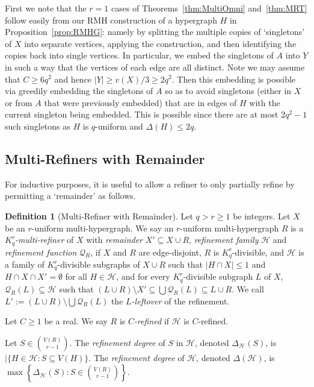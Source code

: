 \documentclass[11pt]{article}
\newcounter{i}
\theoremstyle{plain}
\theoremstyle{plain} %
\theoremstyle{definition}
\newtheorem{definition}[thm]{Definition}
\begin{document}
First we note that the $r=1$ cases of Theorems~\ref{thm:MultiOmni} and~\ref{thm:MRT} follow easily from our RMH construction of a hypergraph $H$ in Proposition~\ref{prop:RMHG}: namely by splitting the multiple copies of `singletons' of $X$ into separate vertices, applying the construction, and then identifying the copies back into single vertices. In particular, we embed the singletons of $A$ into $Y$ in such a way that the vertices of each edge are all distinct. Note we may assume that $C\ge 6q^2$ and hence $|Y|\ge v(X)/3 \ge 2q^2$. Then this embedding is possible via greedily embedding the singletons of $A$ so as to avoid  singletons (either in $X$ or from $A$ that were previously embedded) that are in edges of $H$ with the current singleton being embedded. This is possible since there are at most $2q^2-1$ such singletons as $H$ is $q$-uniform and $\Delta(H)\le 2q$.


\subsection{Multi-Refiners with Remainder}

For inductive purposes, it is useful to allow a refiner to only partially refine by permitting a `remainder' as follows.

\begin{definition}[Multi-Refiner with Remainder]\label{def:Remainder}
Let $q > r\ge 1$ be integers. Let $X$ be an $r$-uniform multi-hypergraph. We say an $r$-uniform multi-hypergraph $R$ is a \emph{$K_q^r$-multi-refiner} of $X$ with \emph{remainder} $X' \subseteq X\cup R$, \emph{refinement family} $\mathcal{H}$ and \emph{refinement function} $\mathcal{Q}_R$, if $X$ and $R$ are edge-disjoint, $R$ is $K_q^r$-divisible, and $\mathcal{H}$ is a family of $K_q^r$-divisible subgraphs of $X\cup R$ such that $|H\cap X|\le 1$ and $H\cap X\cap X'=\emptyset$ for all $H\in\mathcal{H}$, and for every $K_q^r$-divisible subgraph $L$ of $X$, $\mathcal{Q}_R(L) \subseteq \mathcal{H}$ such that $(L\cup R)\setminus X' \subseteq \bigcup \mathcal{Q}_R(L) \subseteq L\cup R$. We call $L':= (L\cup R) \setminus \bigcup \mathcal{Q}_R(L)$ the \emph{$L$-leftover} of the refinement. 


Let $C\ge 1$ be a real.  We say $R$ is \emph{$C$-refined} if $\mathcal{H}$ is $C$-refined.

Let $S\in \binom{V(R)}{r-1}$. The \emph{refinement degree} of $S$ in $\mathcal{H}$, denoted $\Delta_{\mathcal{H}}(S)$, is $|\{H\in \mathcal{H}: S\subseteq V(H)\}$. The \emph{refinement degree} of $\mathcal{H}$, denoted $\Delta(\mathcal{H})$, is $\max \left\{ \Delta_{\mathcal{H}}(S): S\in \binom{V(R)}{r-1} \right\}$.
\end{definition}
\end{document}
